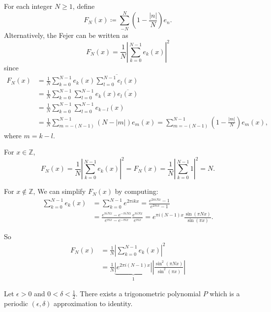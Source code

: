 \documentclass[12pt]{article}
\begin{document}
\begin{definition}
    For each integer $N\geq 1$, define
    \[F_N(x)\coloneq \sum_{-N}^{N}\left(1-\frac{|n|}{N}\right)e_n.\]
    Alternatively, the Fejer can be written as
    \[F_N(x) = \frac{1}{N}\left|\sum_{k=0}^{N-1}e_k(x)\right|^2\]
    since
    \begin{equation*}
        \begin{split}
            F_N(x) &= \frac{1}{N}\sum_{k=0}^{N-1}e_k(x)\overline{\sum_{l=0}^{N-1}e_l(x)}\\
             &= \frac{1}{N}\sum_{k=0}^{N-1}\sum_{l=0}^{N-1}e_k(x)\overline{e_l(x)}\\
             &= \frac{1}{N}\sum_{k=0}^{N-1}\sum_{l=0}^{N-1}e_{k-l}(x)\\
             &= \frac{1}{N}\sum_{m=-(N-1)}^{N-1}\left(N-|m|\right)e_m(x)=\sum_{m=-(N-1)}^{N-1}\left(1-\frac{|m|}{N}\right)e_m(x), 
        \end{split}
    \end{equation*}
where $m=k-l$.
\end{definition}


\begin{remark}
    For $x\in\mathbb{Z}$,
    \[F_N(x) = \frac{1}{N}\left|\sum_{k=0}^{N-1}e_k(x)\right|^2 = F_N(x) = \frac{1}{N}\left|\sum_{k=0}^{N-1}1\right|^2 = N.\]
    
    For $x \notin\mathbb{Z}$,
    We can simplify $F_N(x)$ by computing:
    \begin{align*}
    \sum_{k=0}^{N-1}e_k(x)&=\sum_{k=0}^{N-1}e^{2\pi ikx} = \frac{e^{2\pi iNx}-1}{e^{2\pi ix}-1}\\
     &= \frac{e^{\pi iNx}-e^{-\pi iNx}}{e^{\pi ix}-e^{-\pi ix}}\frac{e^{\pi iNx}}{e^{\pi ix}} = e^{\pi i(N-1)x}\frac{\sin(\pi Nx)}{\sin(\pi x)}. 
    \end{align*}

    So 
    \begin{align*}
        F_N(x) &= \frac{1}{N}\left|\sum_{k=0}^{N-1}e_k(x)\right|^2\\
        & = \frac{1}{N}\underbrace{\left|e^{2\pi i(N-1)x}\right|}_{1}\left|\frac{\sin^2(\pi Nx)}{\sin^2(\pi x)}\right| 
    \end{align*}

\end{remark}


\begin{theorem}
    Let $\epsilon>0$ and $0<\delta<\frac{1}{2}$.
    There exists a trigonometric polynomial $P$ which is a periodic $(\epsilon, \delta)$ approximation to identity.
\end{theorem}
\end{document}
